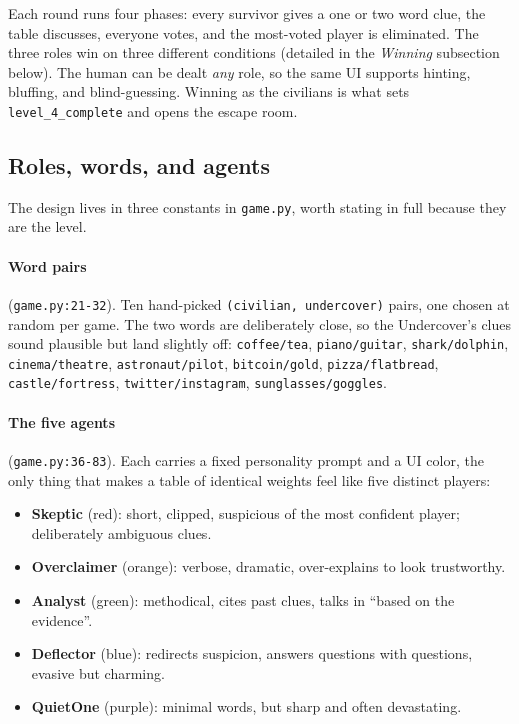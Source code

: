 \documentclass[11pt,a4paper]{article}
\begin{document}
\noindent Each round runs four phases: every survivor gives a one or two word
clue, the table discusses, everyone votes, and the most-voted player is
eliminated. The three roles win on three different conditions (detailed in the
\emph{Winning} subsection below). The human can be dealt \emph{any} role, so the
same UI supports hinting, bluffing, and blind-guessing. Winning as the civilians
is what sets \texttt{level\_4\_complete} and opens the escape room.

\subsection{Roles, words, and agents}
The design lives in three constants in \texttt{game.py}, worth stating in full
because they are the level.

\paragraph{Word pairs} (\texttt{game.py:21-32}). Ten hand-picked
\texttt{(civilian, undercover)} pairs, one chosen at random per game. The two
words are deliberately close, so the Undercover's clues sound plausible but land
slightly off: \texttt{coffee/tea}, \texttt{piano/guitar}, \texttt{shark/dolphin},
\texttt{cinema/theatre}, \texttt{astronaut/pilot}, \texttt{bitcoin/gold},
\texttt{pizza/flatbread}, \texttt{castle/fortress}, \texttt{twitter/instagram},
\texttt{sunglasses/goggles}.

\paragraph{The five agents} (\texttt{game.py:36-83}). Each carries a fixed
personality prompt and a UI color, the only thing that makes a table of identical
weights feel like five distinct players:
\begin{itemize}[leftmargin=*,itemsep=2pt]
    \item \textbf{Skeptic} (red): short, clipped, suspicious of the most confident
    player; deliberately ambiguous clues.
    \item \textbf{Overclaimer} (orange): verbose, dramatic, over-explains to look
    trustworthy.
    \item \textbf{Analyst} (green): methodical, cites past clues, talks in
    ``based on the evidence''.
    \item \textbf{Deflector} (blue): redirects suspicion, answers questions with
    questions, evasive but charming.
    \item \textbf{QuietOne} (purple): minimal words, but sharp and often
    devastating.
\end{itemize}
\end{document}
